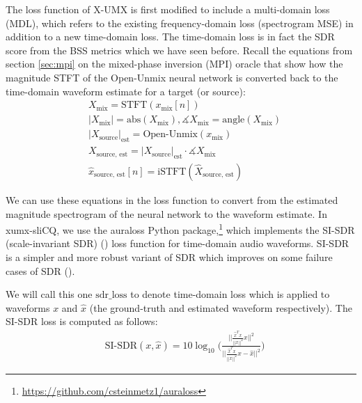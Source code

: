 \documentclass[report.tex]{subfiles}
\begin{document}
The loss function of X-UMX is first modified to include a multi-domain loss (MDL), which refers to the existing frequency-domain loss (spectrogram MSE) in addition to a new time-domain loss. The time-domain loss is in fact the SDR score from the BSS metrics which we have seen before. Recall the equations from section \ref{sec:mpi} on the mixed-phase inversion (MPI) oracle that show how the magnitude STFT of the Open-Unmix neural network is converted back to the time-domain waveform estimate for a target (or source):
\begin{align}
	\nonumber & X_{\text{mix}} = \text{STFT}(x_{\text{mix}}[n])\\
	\nonumber & |X_{\text{mix}}| = \text{abs}(X_{\text{mix}}), \measuredangle{X_{\text{mix}}} = \text{angle}(X_{\text{mix}})\\
	\nonumber & {|X_{\text{source}}|}_{\text{est}} = \text{Open-Unmix}(x_{\text{mix}})\\
	\nonumber & X_{\text{source, est}} = {|X_{\text{source}}|}_{\text{est}} \cdot \measuredangle{X_{\text{mix}}}\\
	\nonumber & \hat{x}_{\text{source, est}}[n] = \text{iSTFT}(\hat{X}_{\text{source, est}})
\end{align}

We can use these equations in the loss function to convert from the estimated magnitude spectrogram of the neural network to the waveform estimate. In xumx-sliCQ, we use the auraloss Python package,\footnote{\url{https://github.com/csteinmetz1/auraloss}} which implements the SI-SDR (scale-invariant SDR) (\cite{roux2018sdr}) loss function for time-domain audio waveforms. SI-SDR is a simpler and more robust variant of SDR which improves on some failure cases of SDR (\cite{roux2018sdr}).

We will call this one $\text{sdr\_loss}$ to denote time-domain loss which is applied to waveforms $x$ and $\hat{x}$ (the ground-truth and estimated waveform respectively). The SI-SDR loss is computed as follows:
\begin{align}
	\nonumber & \text{SI-SDR}(x, \hat{x}) = 10 \log_{10}\Big(\frac{||\frac{\hat{x}^{T}x}{||x||^{2}} x||^{2}}{||\frac{\hat{x}^{T}x}{||x||^{2}} x - \hat{x}||^{2}}\Big)
\end{align}
\end{document}
